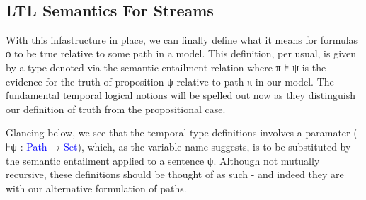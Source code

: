 \documentclass[a4paper, 11pt]{article}
\newcommand{\blue}[1]{\textcolor{blue}{#1}}
\begin{document}
\begin{code}%
%
\>[2]\AgdaSpace{}%
\AgdaSymbol{:}\AgdaSpace{}%
\AgdaSymbol{(}\AgdaSpace{}%
\AgdaSymbol{:}\AgdaSpace{}%
\AgdaSpace{}%
\AgdaSpace{}%
\AgdaSymbol{)}\AgdaSpace{}%
\AgdaSpace{}%
\<%
\\
%
\>[2]\AgdaSpace{}%
\AgdaSpace{}%
\AgdaSymbol{=}\AgdaSpace{}%
\AgdaSpace{}%
\AgdaSpace{}%
\AgdaSpace{}%
\AgdaSpace{}%
\AgdaSpace{}%
\AgdaSpace{}%
\AgdaSpace{}%
\AgdaSymbol{(}\AgdaSpace{}%
\AgdaSymbol{)}\<%
\\
%
\\[\AgdaEmptyExtraSkip]%
%
\>[2]\AgdaSpace{}%
\AgdaSpace{}%
\AgdaSymbol{:}\AgdaSpace{}%
\AgdaSpace{}%
\<%
\\
\>[2][@{}l@{\AgdaIndent{0}}]%
\>[4]\<%
\\
\>[4][@{}l@{\AgdaIndent{0}}]%
\>[6]%
\>[21]\AgdaSymbol{:}\AgdaSpace{}%
\AgdaSpace{}%
\AgdaSpace{}%
\<%
\\
%
\>[6]\AgdaSpace{}%
\AgdaSymbol{:}\AgdaSpace{}%
\AgdaSpace{}%
\<%
\end{code}
\begin{code}[hide]%
%
\>[2]\AgdaSpace{}%
\<%
\end{code}

\subsection{LTL Semantics For Streams}

With this infastructure in place, we can finally define what it means for
formulas ϕ to be true relative to some path in a model. This definition, per
usual, is given by a type denoted via the semantic entailment relation
where π ⊧ ψ is the evidence for the truth of proposition ψ relative to path π in
our model. The fundamental temporal logical notions will be spelled out now as
they distinguish our definition of truth from the propositional case.

Glancing below, we see that the temporal type definitions involves a paramater
(-⊧ψ : \blue{Path} → \blue{Set}), which, as the variable name suggests, is to be substituted
by the semantic entailment applied to a sentence ψ. Although not mutually
recursive, these definitions should be thought of as such - and indeed they are
with our alternative formulation of paths.
\end{document}
